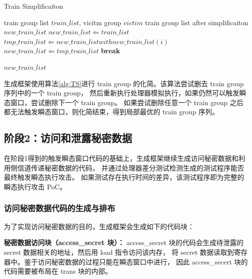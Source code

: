 \begin{algorithm}[!h]
    
    
    \caption{Train Simplificaiton}
    \label{alg:TS}
    \renewcommand{\algorithmicrequire}{\textbf{Input:}}
    \renewcommand{\algorithmicensure}{\textbf{Output:}}
    
    \begin{algorithmic}[1]
        \REQUIRE train group list $train\_list$, vicitm group $victim$  %
        \ENSURE train group list after simplificaiton $new\_train\_list$    %
        \STATE $new\_train\_list \Leftarrow train\_list$
                \STATE $tmp\_train\_list \Leftarrow new\_train\_list with new\_train\_list(i)$
                    \STATE $new\_train\_list \Leftarrow tmp\_train\_list$
                    \STATE \textbf{break}
                \ENDIF
            \ENDFOR
        \ENDFOR

        \RETURN $new\_train\_list$
    \end{algorithmic}
\end{algorithm}

生成框架使用算法\ref{alg:TS}进行 train group 的化简。该算法尝试删去 train group 序列中的一个 train group，
然后重新执行处理器模拟执行，如果仍然可以触发瞬态窗口，尝试删除下一个 train group。
如果尝试删除任意一个 train group 之后都无法触发瞬态窗口，则化简结束，得到局部最优的 train group 序列。\par

\subsection{阶段2：访问和泄露秘密数据}

在阶段1得到的触发瞬态窗口代码的基础上，生成框架继续生成访问秘密数据和利用侧信道传递秘密数据的代码，
并通过处理器差分测试检测生成的测试程序能否最终触发瞬态执行攻击。
如果测试存在执行时间的差异，该测试程序即为完整的瞬态执行攻击 PoC。

\subsubsection{访问秘密数据代码的生成与排布}

为了实现访问秘密数据的目的，生成框架会生成如下的代码块：\par

\textbf{秘密数据访问块（access\_secret 块）：}
access\_secret 块的代码会生成待泄露的 secret 数据相关的地址，然后用 load 指令访问该内存，
将 secret 数据读取到寄存器中。鉴于访问秘密数据的过程只能在瞬态窗口中进行，
因此 access\_secert 块的代码需要被布局在 trans 块的内部。\par


